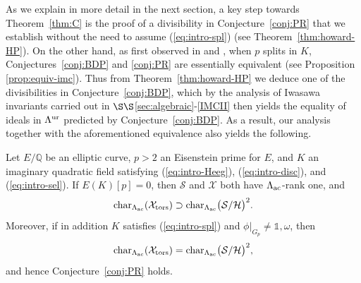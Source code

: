 As we explain in more detail in the next section, a key step towards Theorem~\ref{thm:C} is the proof of a divisibility in  Conjecture~\ref{conj:PR} that we establish without the need to assume (\ref{eq:intro-spl}) (see Theorem~\ref{thm:howard-HP}). On the other hand, as first observed in \cite{castella-PhD} and \cite{wan-heegner}, when $p$ splits in $K$, Conjectures~\ref{conj:BDP} and \ref{conj:PR} are essentially equivalent (see Proposition \ref{prop:equiv-imc}). Thus from Theorem~\ref{thm:howard-HP} we deduce one of the divisibilities in Conjecture~\ref{conj:BDP}, which by the analysis of Iwasawa invariants carried out in $\S\S$\ref{sec:algebraic}-\ref{IMCII} then yields the equality of ideals in $\Lambda^{\rm ur}$ predicted by Conjecture~\ref{conj:BDP}. As a result, our analysis together with the aforementioned equivalence also yields the following.


\begin{cor}
\notready\label{cor:D}
Let $E/\mathbb{Q}$ be an elliptic curve, $p>2$ an Eisenstein prime for $E$, and $K$ an imaginary quadratic field satisfying {\rm (\ref{eq:intro-Heeg})}, {\rm (\ref{eq:intro-disc})}, and
{\rm (\ref{eq:intro-sel})}. If $E(K)[p]=0$, then $\mathcal{S}$ and $\mathcal{X}$ both
have $\Lambda_{\rm ac}$-rank one, and
\[
{\rm char}_{\Lambda_{\rm ac}}(\mathcal{X}_{\rm tors})\supset{\rm char}_{\Lambda_{\rm ac}}\bigl(\mathcal{S}/\mathcal{H}\bigr)^2.
\]
Moreover, if in addition $K$ satisfies {\rm (\ref{eq:intro-spl})} and $\phi\vert_{G_p}\neq\mathds{1},\omega$, then
\[
{\rm char}_{\Lambda_{\rm ac}}(\mathcal{X}_{\rm tors})={\rm char}_{\Lambda_{\rm ac}}\bigl(\mathcal{S}/\mathcal{H}\bigr)^2,
\]
and hence Conjecture~\ref{conj:PR} holds.
\end{cor}


